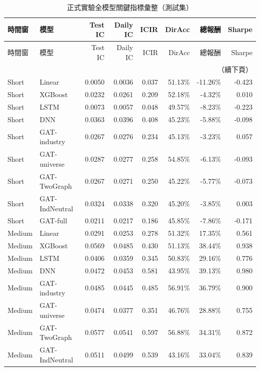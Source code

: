 \begingroup
\small
\setlength{\tabcolsep}{3pt}
\begin{longtable}{llrrrrrr}
\caption{正式實驗全模型關鍵指標彙整（測試集）}
\label{tab:appendix_unified_key_metrics}\\
\toprule
時間窗 & 模型 & Test IC & Daily IC & ICIR & DirAcc & 總報酬 & Sharpe \\
\midrule
\endfirsthead
\toprule
時間窗 & 模型 & Test IC & Daily IC & ICIR & DirAcc & 總報酬 & Sharpe \\
\midrule
\endhead
\midrule
\multicolumn{8}{r}{（續下頁）}\\
\endfoot
\bottomrule
\endlastfoot
Short & Linear & 0.0050 & 0.0036 & 0.037 & 51.13\% & -11.26\% & -0.423 \\
Short & XGBoost & 0.0232 & 0.0261 & 0.209 & 52.18\% & -4.32\% & 0.010 \\
Short & LSTM & 0.0073 & 0.0057 & 0.048 & 49.57\% & -8.23\% & -0.223 \\
Short & DNN & 0.0363 & 0.0396 & 0.408 & 45.23\% & -5.88\% & -0.098 \\
Short & GAT-industry & 0.0267 & 0.0276 & 0.234 & 45.13\% & -3.23\% & 0.057 \\
Short & GAT-universe & 0.0287 & 0.0277 & 0.258 & 54.85\% & -6.13\% & -0.093 \\
Short & GAT-TwoGraph & 0.0267 & 0.0271 & 0.250 & 45.22\% & -5.77\% & -0.073 \\
Short & GAT-IndNeutral & 0.0324 & 0.0338 & 0.320 & 45.20\% & -3.85\% & 0.003 \\
Short & GAT-full & 0.0211 & 0.0217 & 0.186 & 45.85\% & -7.86\% & -0.171 \\
Medium & Linear & 0.0291 & 0.0253 & 0.278 & 51.32\% & 17.35\% & 0.561 \\
Medium & XGBoost & 0.0569 & 0.0485 & 0.430 & 51.13\% & 38.44\% & 0.938 \\
Medium & LSTM & 0.0406 & 0.0359 & 0.345 & 50.83\% & 29.16\% & 0.776 \\
Medium & DNN & 0.0472 & 0.0453 & 0.581 & 43.95\% & 39.13\% & 0.980 \\
Medium & GAT-industry & 0.0485 & 0.0445 & 0.485 & 56.91\% & 36.79\% & 0.900 \\
Medium & GAT-universe & 0.0474 & 0.0377 & 0.351 & 46.76\% & 28.88\% & 0.755 \\
Medium & GAT-TwoGraph & 0.0577 & 0.0541 & 0.597 & 56.88\% & 34.31\% & 0.872 \\
Medium & GAT-IndNeutral & 0.0511 & 0.0499 & 0.539 & 43.16\% & 33.04\% & 0.839 \\

\end{longtable}
